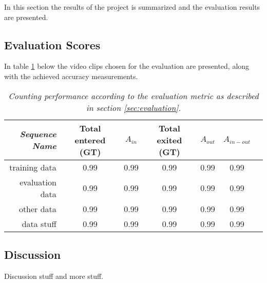 In this section the results of the project is summarized and the evaluation results are presented.

\subsection{Evaluation Scores}
In table \ref{tab:evaluation_performance} below the video clips chosen for the evaluation are presented, along with the achieved accuracy measurements.

\begin{table}[h]
\centering
	\begin{tabular}{r | c | c | c | c | c | c }
		\emph{Sequence Name}		&  Total entered (GT) & \emph{$A_{in}$} & Total exited (GT) & \emph{$A_{out}$} & \emph{$A_{in-out}$}\\
		\hline \hline
		training data			& 0.99 & 0.99 & 0.99 & 0.99 & 0.99 \\
		evaluation data			& 0.99 & 0.99 & 0.99 & 0.99 & 0.99 \\
		other data				& 0.99 & 0.99 & 0.99 & 0.99 & 0.99 \\
		data stuff 				& 0.99 & 0.99 & 0.99 & 0.99 & 0.99 \\
	\end{tabular}
	\caption[System performance]{\textit{Counting performance according to the evaluation metric as described in section \ref{sec:evaluation}.}}
	\label{tab:evaluation_performance}
\end{table}


\subsection{Discussion}
Discussion stuff and more stuff.


